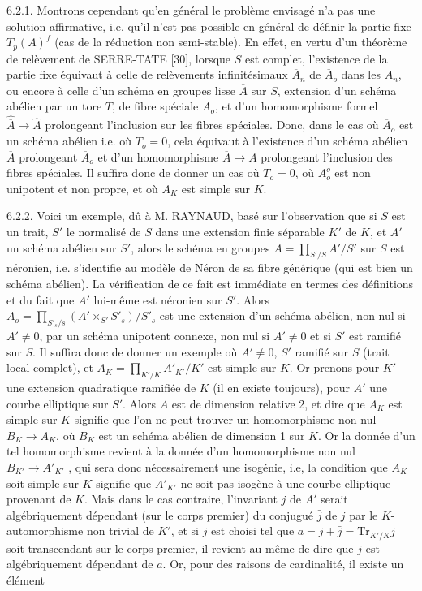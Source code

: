 6.2.1. Montrons cependant qu'en général le problème envisagé n'a pas une solution affirmative, i.e. qu'\underline{il n'est pas possible en général de définir la partie fixe} $T_p(A)^f$ (cas de la réduction non semi-stable). En effet, en vertu d'un théorème de relèvement de SERRE-TATE [30], lorsque $S$ est complet, l'existence de la partie fixe équivaut à celle de relèvements infinitésimaux $\overline{A}_n$ de $\overline{A}_o$ dans les $A_n$, ou encore à celle d'un schéma en groupes lisse $\overline{A}$ sur $S$, extension d'un schéma abélien par un tore $T$, de fibre spéciale $\overline{A}_o$, et d'un homomorphisme formel $\widehat{\overline{A}} \longrightarrow \widehat{A}$ prolongeant l'inclusion sur les fibres spéciales. Donc, dans le cas où $\overline{A}_o$ est un schéma abélien i.e. où $T_o = 0$, cela équivaut à l'existence d'un schéma abélien $\overline{A}$ prolongeant $\overline{A}_o$ et d'un homomorphisme $\overline{A} \longrightarrow A$ prolongeant l'inclusion des fibres spéciales. Il suffira donc de donner un cas où $T_o = 0$, où $A_o^o$ est non unipotent et non propre, et où $A_K$ est simple sur $K$.



6.2.2. Voici un exemple, dû à M. RAYNAUD, basé sur l'observation que si $S$ est un trait, $S'$ le normalisé de $S$ dans une extension finie séparable $K'$ de $K$, et $A'$ un schéma abélien sur $S'$, alors le schéma en groupes $A = \prod_{S'/S} A'/S'$ sur $S$ est néronien, i.e. s'identifie au modèle de Néron de sa fibre générique (qui est bien un schéma abélien). La vérification de ce fait est immédiate en termes des définitions et du fait que $A'$ lui-même est néronien sur $S'$. Alors $A_o = \prod_{S'_s/s}(A' \times_{S'} S'_s)/S'_s$ est une extension d'un schéma abélien, non nul si $A' \neq 0$, par un schéma unipotent connexe, non nul si $A' \neq 0$ et si $S'$ est ramifié sur $S$. Il suffira donc de donner un exemple où $A' \neq 0$, $S'$ ramifié sur $S$ (trait local complet), et $A_K = \prod_{K'/K} A'_{K'}/K'$ est simple sur $K$. Or prenons pour $K'$ une extension quadratique ramifiée de $K$ (il en existe toujours), pour $A'$ une courbe elliptique sur $S'$. Alors $A$ est de dimension relative 2, et dire que $A_K$ est simple sur $K$ signifie que l'on ne peut trouver un homomorphisme non nul $B_K \longrightarrow A_K$, où $B_K$ est un schéma abélien de dimension 1 sur $K$. Or la donnée d'un tel homomorphisme revient à la donnée d'un homomorphisme non nul $B_{K'} \longrightarrow A'_{K'}$ , qui sera donc nécessairement une isogénie, i.e, la condition que $A_K$ soit simple sur $K$ signifie que $A'_{K'}$ ne soit pas isogène à une courbe elliptique provenant de $K$. Mais dans le cas contraire, l'invariant $j$ de $A'$ serait algébriquement dépendant (sur le corps premier) du conjugué $\bar{j}$ de $j$ par le $K$-automorphisme non trivial de $K'$, et si $j$ est choisi tel que $a = j + \bar{j} = \mathrm{Tr}_{K'/K} j$ soit transcendant sur le corps premier, il revient au même de dire que $j$ est algébriquement dépendant de $a$. Or, pour des raisons de cardinalité, il existe un élément


